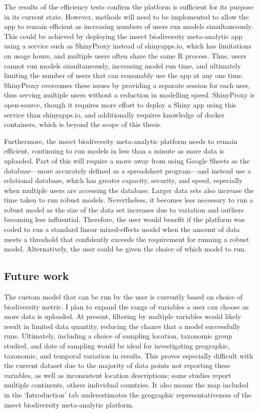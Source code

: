 \documentclass[11pt]{article}
\begin{document}
			\noindent The results of the efficiency tests confirm the platform is sufficient for its purpose in its current state. However, methods will need to be implemented to allow the app to remain efficient as increasing numbers of users run models simultaneously. This could be achieved by deploying the insect biodiversity meta-analytic app using a service such as ShinyProxy \parencite{open2022shiny} instead of shinyapps.io, which has limitations on usage hours, and multiple users often share the same R process. Thus, users cannot run models simultaneously, increasing model run time, and ultimately limiting the number of users that can reasonably use the app at any one time. ShinyProxy overcomes these issues by providing a separate session for each user, thus serving multiple users without a reduction in modelling speed. ShinyProxy is open-source, though it requires more effort to deploy a Shiny app using this service than shinyapps.io, and additionally requires knowledge of docker containers, which is beyond the scope of this thesis.
			
			\noindent Furthermore, the insect biodiversity meta-analytic platform needs to remain efficient, continuing to run models in less than a minute as more data is uploaded. Part of this will require a move away from using Google Sheets as the database—more accurately defined as a spreadsheet program—and instead use a relational database, which has greater capacity, security, and speed, especially when multiple users are accessing the database. Larger data sets also increase the time taken to run robust models. Nevertheless, it becomes less necessary to run a robust model as the size of the data set increases due to variation and outliers becoming less influential. Therefore, the user would benefit if the platform was coded to run a standard linear mixed-effects model when the amount of data meets a threshold that confidently exceeds the requirement for running a robust model. Alternatively, the user could be given the choice of which model to run.  
	
		\subsection{Future work}
			The custom model that can be run by the user is currently based on choice of biodiversity metric. I plan to expand the range of variables a user can choose as more data is uploaded. At present, filtering by multiple variables would likely result in limited data quantity, reducing the chance that a model successfully runs. Ultimately, including a choice of sampling location, taxonomic group studied, and date of sampling would be ideal for investigating geographic, taxonomic, and temporal variation in results. This proves especially difficult with the current dataset due to the majority of data points not reporting these variables, as well as inconsistent location descriptions; some studies report multiple continents, others individual countries. It also means the map included in the ‘Introduction’ tab underestimates the geographic representativeness of the insect biodiversity meta-analytic platform. 
			
\end{document}
